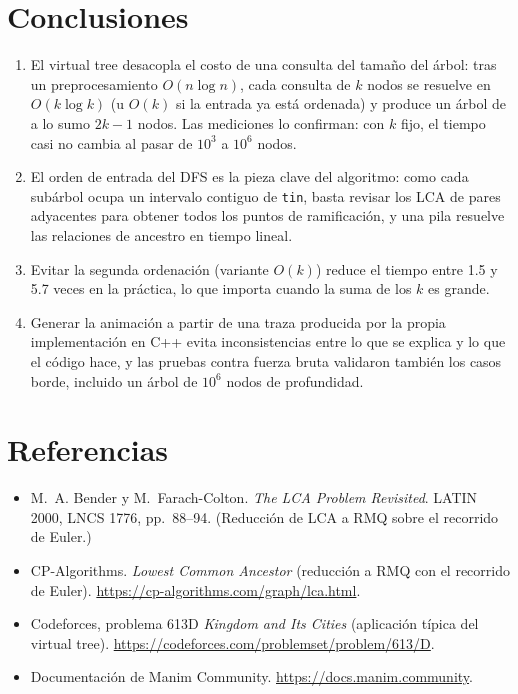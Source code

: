 \documentclass[11pt,a4paper]{article}
\theoremstyle{plain}
\begin{document}
\section{Conclusiones}

\begin{enumerate}[label=\arabic*.]
  \item El virtual tree desacopla el costo de una consulta del tamaño del árbol: tras un
        preprocesamiento $O(n \log n)$, cada consulta de $k$ nodos se resuelve en
        $O(k \log k)$ (u $O(k)$ si la entrada ya está ordenada) y produce un árbol de a lo
        sumo $2k-1$ nodos. Las mediciones lo confirman: con $k$ fijo, el tiempo casi no
        cambia al pasar de $10^3$ a $10^6$ nodos.
  \item El orden de entrada del DFS es la pieza clave del algoritmo: como cada subárbol ocupa
        un intervalo contiguo de \texttt{tin}, basta revisar los LCA de pares adyacentes para
        obtener todos los puntos de ramificación, y una pila resuelve las relaciones de
        ancestro en tiempo lineal.
  \item Evitar la segunda ordenación (variante $O(k)$) reduce el tiempo entre 1.5 y 5.7 veces
        en la práctica, lo que importa cuando la suma de los $k$ es grande.
  \item Generar la animación a partir de una traza producida por la propia implementación
        en C++ evita inconsistencias entre lo que se explica y lo que el código hace, y las
        pruebas contra fuerza bruta validaron también los casos borde, incluido un árbol de
        $10^6$ nodos de profundidad.
\end{enumerate}

\section*{Referencias}
\begin{itemize}
  \item M.~A. Bender y M.~Farach-Colton. \emph{The LCA Problem Revisited}. LATIN 2000,
        LNCS 1776, pp.~88--94. (Reducción de LCA a RMQ sobre el recorrido de Euler.)
  \item CP-Algorithms. \emph{Lowest Common Ancestor} (reducción a RMQ con el recorrido de
        Euler). \url{https://cp-algorithms.com/graph/lca.html}.
  \item Codeforces, problema 613D \emph{Kingdom and Its Cities} (aplicación típica del
        virtual tree). \url{https://codeforces.com/problemset/problem/613/D}.
  \item Documentación de Manim Community. \url{https://docs.manim.community}.
\end{itemize}
\end{document}
